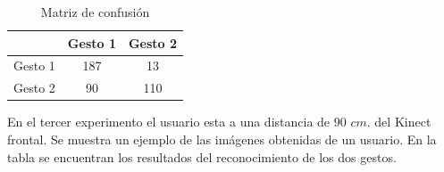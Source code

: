 \begin{table}[h!] 
\begin{center}
\begin{tabular}{ r || c | c |} 
 
        & Gesto 1 & Gesto 2 \\ \hline \hline  
Gesto 1 & 187     &  13     \\ \hline  
Gesto 2 & 90      & 110     \\   

\end{tabular}
\end{center} 
\caption{Matriz de confusión}
\end{table}


En el tercer experimento el usuario esta a una distancia de $90$ $cm.$ del Kinect frontal. Se muestra un ejemplo de las imágenes obtenidas de un usuario. En la tabla se encuentran los resultados del reconocimiento de los dos gestos.    

